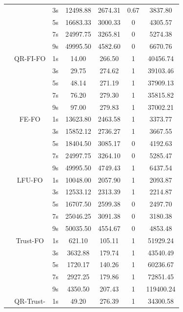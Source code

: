 \begin{center}
\begin{longtable}{|c||c||c|c|c|c|c|}
			   &	  & 3s & 12498.88 & 2674.31 & 0.67 & 3837.80 \\ \cline{3-7}
			   &      & 5s & 16683.33 & 3000.33 & 0 & 4305.57 \\ \cline{3-7}
			   &      & 7s & 24997.75 & 3265.81 & 0 & 5274.38 \\ \cline{3-7}
			   &      & 9s & 49995.50 & 4582.60 & 0 & 6670.76 \\ \cline{2-7}
			   & QR-FI-FO & 1s & 14.00 & 266.50 & 1 & 40456.74 \\ \cline{3-7}
			   &		  & 3s & 29.75 & 274.62 & 1 & 39103.46\\ \cline{3-7}
			   &          & 5s & 48.14 & 271.19 & 1 & 37909.13 \\ \cline{3-7}
			   &          & 7s & 76.20 & 279.30 & 1 & 35815.82 \\ \cline{3-7}
			   &          & 9s & 97.00 & 279.83 & 1 & 37002.21 \\ \cline{2-7}
			   & FE-FO & 1s & 13623.80 & 2463.58 & 1 & 3373.77 \\ \cline{3-7}
			   &	   & 3s & 15852.12 & 2736.27 & 1 & 3667.55 \\ \cline{3-7}
			   &       & 5s & 18404.50 & 3085.17 & 0 & 4192.63 \\ \cline{3-7}
			   &       & 7s & 24997.75 & 3264.10 & 0 & 5285.47 \\ \cline{3-7}
			   &       & 9s & 49995.50 & 4749.43 & 1 & 6437.54 \\ \cline{2-7}
			   & LFU-FO & 1s & 10048.00 & 2057.90 & 1 & 2093.87 \\ \cline{3-7}
			   &		& 3s & 12533.12 & 2313.39 & 1 & 2214.87 \\ \cline{3-7}
			   &        & 5s & 16707.50 & 2599.38 & 0 & 2497.70 \\ \cline{3-7}
			   &        & 7s & 25046.25 & 3091.38 & 0 & 3180.38 \\ \cline{3-7}
			   &        & 9s & 50035.50 & 4554.67 & 0 & 4853.48 \\ \cline{2-7}
			   & Trust-FO & 1s & 621.10 & 105.11 & 1 & 51929.24\\ \cline{3-7}
			   &		  & 3s & 3632.88 & 179.74 & 1& 43540.49\\ \cline{3-7}
			   &          & 5s & 1720.17 & 140.26 & 1& 60236.67\\ \cline{3-7}
			   &          & 7s & 2927.25 & 179.86 & 1& 72851.45\\ \cline{3-7}
			   &          & 9s & 4350.50 & 207.43 & 1& 119400.24\\ \cline{2-7}
               & QR-Trust- & 1s & 49.20 & 276.39 & 1 & 34300.58\\ \cline{3-7}

\end{longtable}
\end{center}
